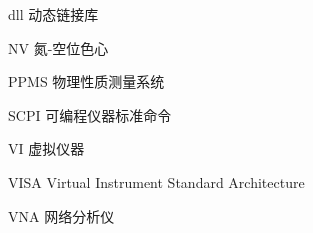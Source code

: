\begin{denotation}[3cm]
\item[dll] 动态链接库
\item[NV] 氮-空位色心
\item[PPMS] 物理性质测量系统
\item[SCPI] 可编程仪器标准命令
\item[VI] 虚拟仪器
\item[VISA] Virtual Instrument Standard Architecture
\item[VNA] 网络分析仪
\end{denotation}
